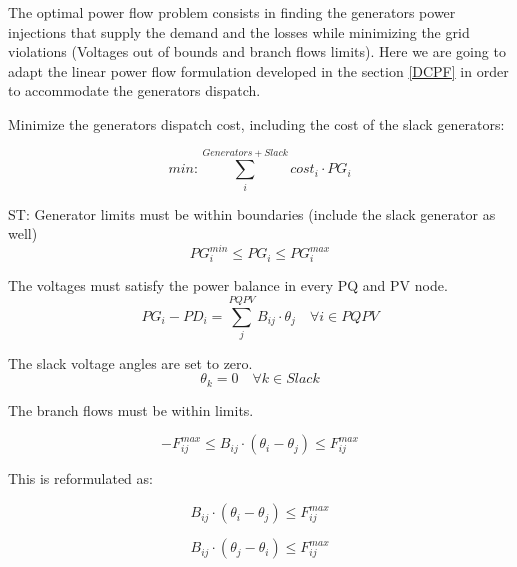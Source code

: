 \documentclass[nols,a4paper,twoside,symmetric,notoc,fleqn]{tufte-book}
\begin{document}
The optimal power flow problem consists in finding the generators power injections that supply the demand and the losses while minimizing the grid violations (Voltages out of bounds and branch flows limits). Here we are going to adapt the linear power flow formulation developed in the section \ref{DCPF} in order to accommodate the generators dispatch.

Minimize the generators dispatch cost, including the cost of the slack generators:

\begin{equation}
min: \sum_i^{Generators+Slack} cost_i \cdot PG_i 
\end{equation}

ST: 
Generator limits must be within boundaries (include the slack generator as well)
\begin{equation}
PG_i^{min} \leq PG_i \leq PG_i^{max}
\end{equation}


The voltages must satisfy the power balance in every PQ and PV node.
\begin{equation}
PG_i - PD_i=\sum_j^{PQPV} B_{ij} \cdot \theta_j  \quad  \forall i \in PQPV
\end{equation}



The slack voltage angles are set to zero.
\begin{equation}
\theta_k=0   \quad \forall k \in Slack
\end{equation}


The branch flows must be within limits.

\begin{equation}
-F_{ij}^{max} \leq B_{ij}⋅(\theta_i - \theta_j) \leq F_{ij}^{max}
\end{equation}


This is reformulated as:

\begin{equation}
 B_{ij}⋅(\theta_i - \theta_j) \leq F_{ij}^{max}
\end{equation}

\begin{equation}
 B_{ij}⋅(\theta_j - \theta_i) \leq F_{ij}^{max}
\end{equation}
\end{document}
